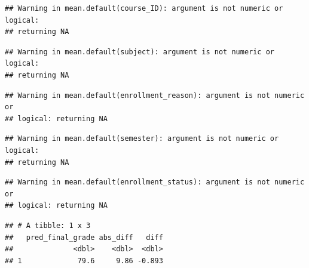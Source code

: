 \documentclass[]{apa6}
\theoremstyle{definition}
\theoremstyle{definition}
\theoremstyle{definition}
\theoremstyle{remark}
\begin{document}
\begin{verbatim}
## Warning in mean.default(course_ID): argument is not numeric or logical:
## returning NA
\end{verbatim}

\begin{verbatim}
## Warning in mean.default(subject): argument is not numeric or logical:
## returning NA
\end{verbatim}

\begin{verbatim}
## Warning in mean.default(enrollment_reason): argument is not numeric or
## logical: returning NA
\end{verbatim}

\begin{verbatim}
## Warning in mean.default(semester): argument is not numeric or logical:
## returning NA
\end{verbatim}

\begin{verbatim}
## Warning in mean.default(enrollment_status): argument is not numeric or
## logical: returning NA
\end{verbatim}

\begin{verbatim}
## # A tibble: 1 x 3
##   pred_final_grade abs_diff   diff
##              <dbl>    <dbl>  <dbl>
## 1             79.6     9.86 -0.893
\end{verbatim}
\end{document}
